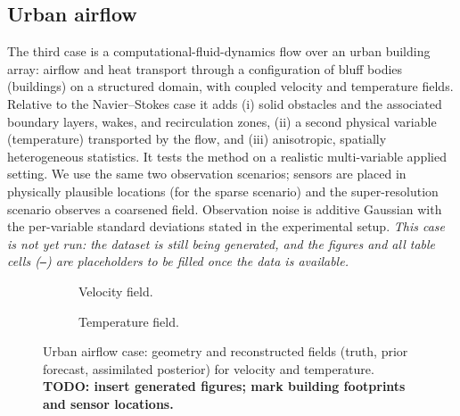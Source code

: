 \subsection{Urban airflow}
\label{subsec:results_urban}
The third case is a computational-fluid-dynamics flow over an urban building array: airflow and heat transport through a configuration of bluff bodies (buildings) on a structured domain, with coupled velocity and temperature fields. Relative to the Navier--Stokes case it adds (i) solid obstacles and the associated boundary layers, wakes, and recirculation zones, (ii) a second physical variable (temperature) transported by the flow, and (iii) anisotropic, spatially heterogeneous statistics. It tests the method on a realistic multi-variable applied setting. We use the same two observation scenarios; sensors are placed in physically plausible locations (for the sparse scenario) and the super-resolution scenario observes a coarsened field. Observation noise is additive Gaussian with the per-variable standard deviations stated in the experimental setup. \emph{This case is not yet run: the dataset is still being generated, and the figures and all table cells (\texttt{--}) are placeholders to be filled once the data is available.}

\begin{figure}[ht]
    \centering
    \begin{subfigure}{0.48\linewidth}\centering
        \caption{Velocity field.}\label{fig:urban_vel}
    \end{subfigure}\hfill
    \begin{subfigure}{0.48\linewidth}\centering
        \caption{Temperature field.}\label{fig:urban_temp}
    \end{subfigure}
    \caption{Urban airflow case: geometry and reconstructed fields (truth, prior forecast, assimilated posterior) for velocity and temperature. \textbf{TODO: insert generated figures; mark building footprints and sensor locations.}}
    \label{fig:urban_fields}
\end{figure}

